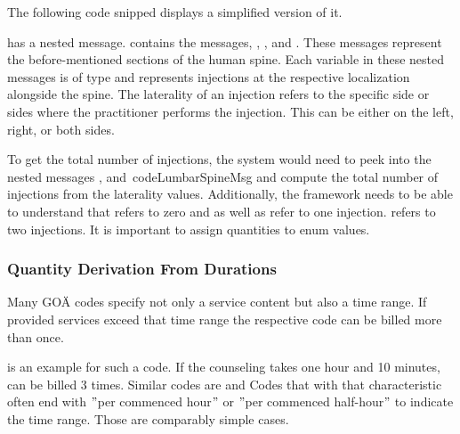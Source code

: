The following code snipped displays a simplified version of it.



 has a nested message.
 contains the messages, , , and .
These messages represent the before-mentioned sections of the human spine.
Each variable in these nested messages is of type  and represents injections at the respective localization alongside the spine.
The laterality of an injection refers to the specific side or sides where the practitioner performs the injection.
This can be either on the left, right, or both sides.

To get the total number of injections, the system would need to peek into the nested messages ,  and\ code{LumbarSpineMsg} and compute the total number of injections from the laterality values.
Additionally, the framework needs to be able to understand that  refers to zero and  as well as refer to one injection.
 refers to two injections.
It is important to assign quantities to enum values.

\subsubsection{Quantity Derivation From Durations}\label{subsec:quantity-derivation-from-durations}
Many GOÄ codes specify not only a service content but also a time range.
If provided services exceed that time range the respective code can be billed more than once.

 is an example for such a code.
If the counseling takes one hour and 10 minutes,  can be billed 3 times.
Similar codes are 
and 
Codes that with that characteristic often end with \("\)per commenced hour\("\) or \("\)per commenced half-hour\("\) to indicate the time range.
Those are comparably simple cases.

